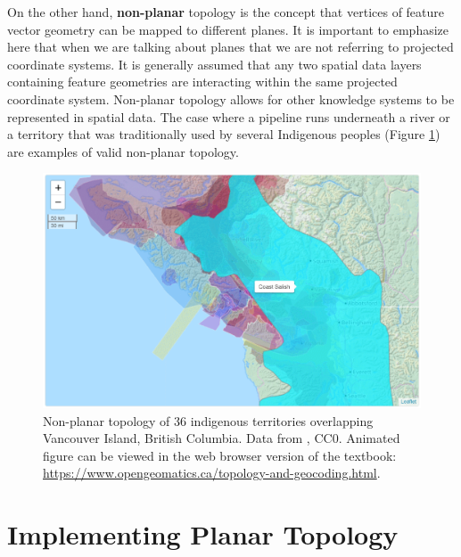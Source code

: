 \documentclass[
]{book}
\begin{document}
On the other hand, \textbf{non-planar} topology is the concept that vertices of feature vector geometry can be mapped to different planes. It is important to emphasize here that when we are talking about planes that we are not referring to projected coordinate systems. It is generally assumed that any two spatial data layers containing feature geometries are interacting within the same projected coordinate system. Non-planar topology allows for other knowledge systems to be represented in spatial data. The case where a pipeline runs underneath a river or a territory that was traditionally used by several Indigenous peoples (Figure \ref{fig:7-native-land-leaflet}) are examples of valid non-planar topology.





\begin{figure}
\includegraphics[width=1\linewidth]{images/07-native-land-leaflet} \caption{Non-planar topology of 36 indigenous territories overlapping Vancouver Island, British Columbia. Data from \citep{native_land_native_nodate}, CC0. Animated figure can be viewed in the web browser version of the textbook: \url{https://www.opengeomatics.ca/topology-and-geocoding.html}.}\label{fig:7-native-land-leaflet}
\end{figure}

\section{Implementing Planar Topology}\label{implementing-planar-topology}
\end{document}
